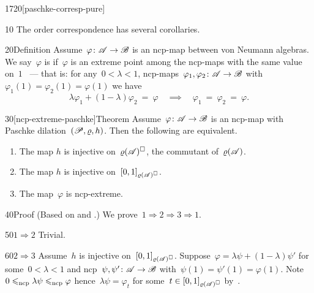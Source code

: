 \begin{parsec}{1720}[paschke-corresp-pure]%
\begin{point}{10}%
The order correspondence 
    has several corollaries.
\end{point}
\begin{point}{20}{Definition}%
Assume~$\varphi\colon \mathscr{A} \to \mathscr{B}$ is an ncp-map between von Neumann
    algebras.
We say~$\varphi$ is 
    if~$\varphi$ is an extreme point among
    the ncp-maps with the same value on~$1$~\cite{stormer1963positive}
    ---
    that is:
    for any~$0 < \lambda < 1$, ncp-maps~$\varphi_1,\varphi_2\colon \mathscr{A} \to \mathscr{B}$
    with~$\varphi_1(1) = \varphi_2(1) = \varphi(1)$
    we have
    \begin{equation*}
    \lambda \varphi_1  +  (1-\lambda)\varphi_2 \ =\  \varphi
    \quad \implies \quad
    \varphi_1\ =\ \varphi_2\ =\ \varphi.
    \end{equation*}
\end{point}
\spacingfix{}
\begin{point}{30}[ncp-extreme-paschke]{Theorem}%
Assume~$\varphi\colon \mathscr{A} \to \mathscr{B}$ is an ncp-map
    with Paschke dilation~$(\mathscr{P}, \varrho, h)$.
Then the following are equivalent.
\begin{enumerate}
    \item The map $h$ is injective on~$\varrho(\mathscr{A})^\square$,
                the commutant of~$\varrho(\mathscr{A})$.
    \item The map $h$ is injective on~$[0,1]_{\varrho(\mathscr{A})^\square}$.
    \item The map~$\varphi$ is ncp-extreme.
\end{enumerate}
\spacingfix{}
\begin{point}{40}{Proof}%
(Based on \cite[prop.~1.4.6]{arveson}
    and \cite[thm.~5.4]{paschke}.)
We prove~$1 \Rightarrow 2 \Rightarrow 3 \Rightarrow 1$.
\begin{point}{50}{$1 \Rightarrow 2$}%
Trivial.
\end{point}
\begin{point}{60}{$2 \Rightarrow 3$}%
Assume~$h$ is injective on~$[0,1]_{\varrho(\mathscr{A})^\square}$.
Suppose~$\varphi = \lambda \psi + (1 - \lambda) \psi'$
    for some~$0 < \lambda < 1$
    and ncp~$\psi,\psi'\colon \mathscr{A} \to \mathscr{B}$
    with~$\psi(1) = \psi'(1) = \varphi(1)$.
Note~$0 \leqslant_{\mathrm{ncp}} \lambda\psi \leqslant_{\mathrm{ncp}} \varphi$
hence~$\lambda\psi = \varphi_t$ for some~$t \in [0,1]_{\varrho(\mathscr{A})^\square}$
by~.

\end{point}
\end{point}
\end{point}
\end{parsec}
